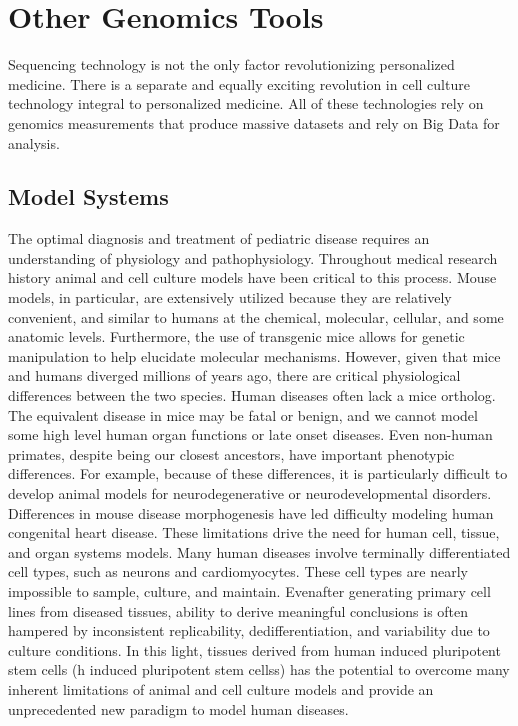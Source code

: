 \documentclass[sigconf]{acmart}
\begin{document}
\section{Other Genomics Tools}
Sequencing technology is not the only factor revolutionizing personalized medicine.  There is a separate and equally exciting revolution in cell culture technology integral to personalized medicine.  All of these technologies rely on genomics measurements that produce massive datasets and rely on Big Data for analysis.   

\subsection{Model Systems}
    The optimal diagnosis and treatment of pediatric disease requires an understanding of
physiology and pathophysiology. Throughout medical research history animal and cell culture
models have been critical to this process. Mouse models, in particular, are extensively utilized
because they are relatively convenient, and similar to humans at the chemical, molecular,
cellular, and some anatomic levels. Furthermore, the use of transgenic mice allows for genetic
manipulation to help elucidate molecular mechanisms. However, given that mice and humans
diverged millions of years ago, there are critical physiological differences between the two
species.
Human diseases often lack a mice ortholog. The equivalent disease in mice may be fatal
or benign, and we cannot model some high level human organ functions or late onset diseases.
Even non-human primates, despite being our closest ancestors, have important phenotypic
differences. For example, because of these differences, it is particularly difficult to develop
animal models for neurodegenerative or neurodevelopmental disorders. Differences in
mouse disease morphogenesis have led difficulty modeling human congenital heart disease. These limitations drive the need for human cell, tissue, and organ systems models. 
Many human diseases involve terminally differentiated cell types, such as neurons and cardiomyocytes. These cell types are nearly impossible to sample, culture, and maintain. Evenafter generating primary cell lines from diseased tissues, ability to derive meaningful conclusions
is often hampered by inconsistent replicability, dedifferentiation, and variability due to culture
conditions. In this light, tissues derived from human induced pluripotent stem cells (h induced pluripotent stem cellss) has
the potential to overcome many inherent limitations of animal and cell culture models and
provide an unprecedented new paradigm to model human diseases.
    
\end{document}
